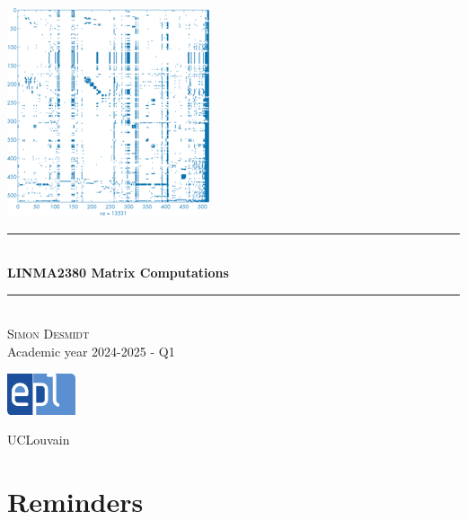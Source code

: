 \documentclass[12pt, openany]{report}
\theoremstyle{definition}
\newcommand{\HRule}{\rule{\linewidth}{0.5mm}}
\begin{document}
\begin{titlepage}
    \begin{sffamily}
    \begin{center}
        \includegraphics[scale=1]{img/page_de_garde.png} \\[1cm]
        \HRule \\[0.4cm]
        { \huge \bfseries LINMA2380 Matrix Computations \\[0.4cm] }
    
        \HRule \\[1.5cm]
        \textsc{\LARGE Simon Desmidt}\\[1cm]
        \vfill
        \vspace{2cm}
        {\large Academic year 2024-2025 - Q1}
        \vspace{0.4cm}
         
        \includegraphics[width=0.15\textwidth]{img/epl.png}
        
        UCLouvain\\
    
    \end{center}
    \end{sffamily}
\end{titlepage}

\setcounter{tocdepth}{1}
\tableofcontents
\chapter{Reminders}
\end{document}
